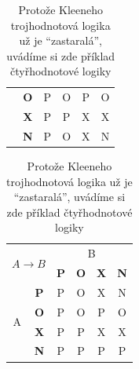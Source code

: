 \documentclass[11pt,a4paper]{article}
\begin{document}
\begin{table}[h]
\begin{tabular}[p]{|c|c|c|c|c|c|}
                \cline{2-6}
                                   & \textbf{O}                    & P          & O          & P          & O           \\
                \cline{2-6}
                                   & \textbf{X}                    & P          & P          & X          & X           \\
                \cline{2-6}
                                   & \textbf{N}                    & P          & O          & X          & N           \\
                \hline
            \end{tabular}
            \begin{tabular}[p]{|c|c|c|c|c|c|}
                \hline
                \multicolumn{2}{|l|}{\multirow{2}{*}{$A \rightarrow B$ }} & \multicolumn{4}{c|}{B}                             \\
                \cline{3-6}
                \multicolumn{2}{|l|}{}                                         & \textbf{P} & \textbf{O} & \textbf{X} & \textbf{N}  \\
                \hline
                \multirow{4}{*}{A} & \textbf{P}                                & P          & O          & X          & N           \\
                \cline{2-6}
                                   & \textbf{O}                                & P          & O          & P          & O           \\
                \cline{2-6}
                                   & \textbf{X}                                & P          & P          & X          & X           \\
                \cline{2-6}
                                   & \textbf{N}                                & P          & P          & P          & P           \\
                \hline
            \end{tabular}
            \caption{Protože Kleeneho trojhodnotová logika už je \enquote{zastaralá}, uvádíme si zde příklad čtyřhodnotové logiky}
            \label{table:logika}
        \end{table}


        \pagebreak


\newpage
\end{document}
